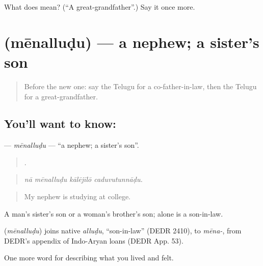 \begin{tcolorbox}[breakable,colback=teal!4,colframe=teal!35!black,title={Before you move on}]
What does  mean? (\textquotedblleft{}A great-grandfather\textquotedblright{}.) Say it once more.
\end{tcolorbox}
\section[\texorpdfstring{\te{మేనల్లుడు} (mēnalluḍu)}{మేనల్లుడు (mēnalluḍu)}]{ (mēnalluḍu) — a nephew; a sister's son}

\label{lesson:TE-C530-menalludu}



\begin{quote}
Before the new one: say the Telugu for a co-father-in-law, then the Telugu for a great-grandfather.
\end{quote}

\subsection*{You'll want to know: }
\textbf{} — \emph{mēnalluḍu} — \textquotedblleft{}a nephew; a sister's son\textquotedblright{}.

\begin{quote}
   .
\end{quote}

\begin{quote}
\emph{nā mēnalluḍu kālējīlō caduvutunnāḍu.}
\end{quote}

\begin{quote}
My nephew is studying at college.
\end{quote}

A man's sister's son or a woman's brother's son;  alone is a son-in-law.

\begin{cousinweb}
\textbf{} (\emph{mēnalluḍu}) joins native \emph{alluḍu}, \textquotedblleft{}son-in-law\textquotedblright{} (DEDR 2410), to \emph{mēna-}, from DEDR's appendix of Indo-Aryan loans (DEDR App. 53).
\end{cousinweb}

\begin{grammarlens}[title={What you've built}]
One more word for describing what you lived and felt.
\end{grammarlens}

